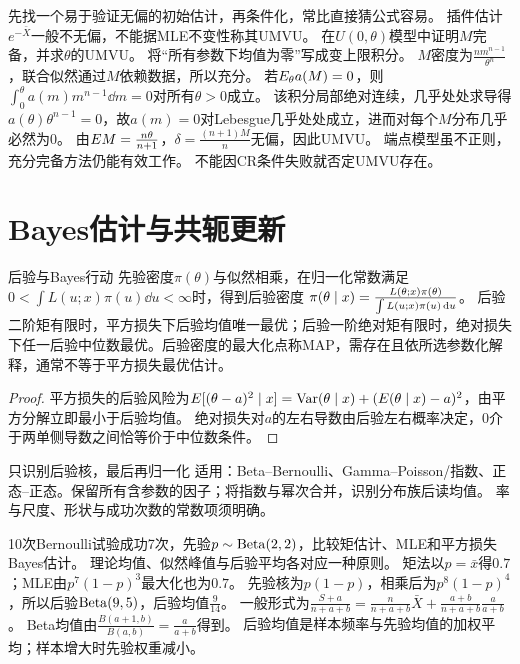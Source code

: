 {先找一个易于验证无偏的初始估计，再条件化，常比直接猜公式容易。}
{插件估计$e^{-\bar X}$一般不无偏，不能据MLE不变性称其UMVU。}
{在$U(0,\theta)$模型中证明$M$完备，并求$\theta$的UMVU。}
{将“所有参数下均值为零”写成变上限积分。}
{$M$密度为$\frac{nm^{n-1}}{\theta^n}$，联合似然通过$M$依赖数据，所以充分。
若$E_\theta a(M)=0$，则$\int_0^\theta a(m)m^{n-1}\dd m=0$对所有$\theta>0$成立。
该积分局部绝对连续，几乎处处求导得$a(\theta)\theta^{n-1}=0$，故$a(m)=0$对Lebesgue几乎处处成立，进而对每个$M$分布几乎必然为0。
由$E M=\frac{n\theta}{n+1}$，$\delta=\frac{(n+1)M}{n}$无偏，因此UMVU。}
{端点模型虽不正则，充分完备方法仍能有效工作。}
{不能因CR条件失败就否定UMVU存在。}

\section{Bayes估计与共轭更新}\label{sec:74}
\begin{definition}{后验与Bayes行动}
先验密度$\pi(\theta)$与似然相乘，在归一化常数满足$0<\int L(u;x)\pi(u)\dd u<\infty$时，得到后验密度
$\pi(\theta\mid x)=\frac{L(\theta;x)\pi(\theta)}{\int L(u;x)\pi(u)\,\mathrm d u}$。
后验二阶矩有限时，平方损失下后验均值唯一最优；后验一阶绝对矩有限时，绝对损失下任一后验中位数最优。后验密度的最大化点称MAP，需存在且依所选参数化解释，通常不等于平方损失最优估计。
\end{definition}
\begin{proof}
平方损失的后验风险为$E[(\theta-a)^2\mid x]=\operatorname{Var}(\theta\mid x)+(E(\theta\mid x)-a)^2$，由平方分解立即最小于后验均值。
绝对损失对$a$的左右导数由后验左右概率决定，0介于两单侧导数之间恰等价于中位数条件。
\end{proof}
\begin{method}{只识别后验核，最后再归一化}
适用：Beta--Bernoulli、Gamma--Poisson/指数、正态--正态。保留所有含参数的因子；将指数与幂次合并，识别分布族后读均值。
率与尺度、形状与成功次数的常数项须明确。
\end{method}
{10次Bernoulli试验成功7次，先验$p\sim\operatorname{Beta}(2,2)$，比较矩估计、MLE和平方损失Bayes估计。}
{理论均值、似然峰值与后验平均各对应一种原则。}
{矩法以$p=\bar x$得$0.7$；MLE由$p^7(1-p)^3$最大化也为$0.7$。
先验核为$p(1-p)$，相乘后为$p^8(1-p)^4$，所以后验$\operatorname{Beta}(9,5)$，后验均值$\frac{9}{14}$。
一般形式为$\frac{S+a}{n+a+b}=\frac n{n+a+b}\bar X+\frac{a+b}{n+a+b}\frac a{a+b}$。
Beta均值由$\frac{B(a+1,b)}{B(a,b)}=\frac{a}{a+b}$得到。}
{后验均值是样本频率与先验均值的加权平均；样本增大时先验权重减小。}
